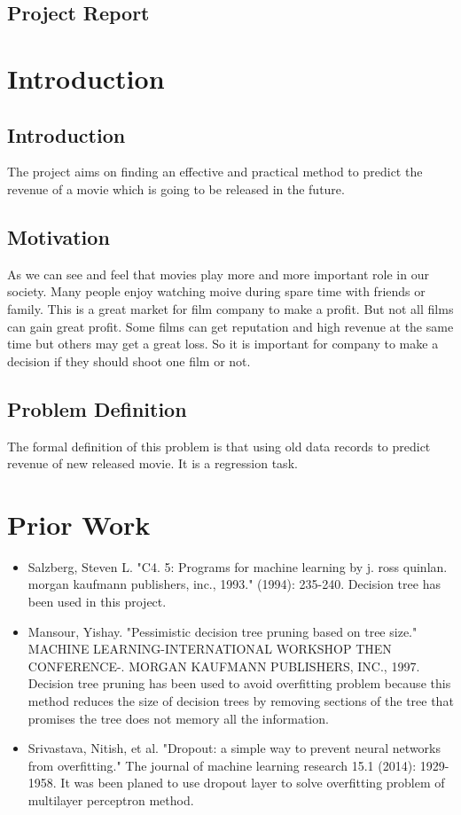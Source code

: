\documentclass[UTF8]{article}
\begin{document}
\begin{center}
    \section*{\textbf{Project Report}}
\end{center}

\section{Introduction}
\subsection{Introduction}
The project aims on finding an effective
and practical method to predict the revenue of a movie which is going to
be released in the future.
\subsection{Motivation}
As we can see and feel that movies play more and more important
role in our society. Many people enjoy watching moive during spare time with friends or family.
This is a great market for film company to make a profit. But not all films can gain great profit.
Some films can get reputation and high revenue at the same time but others may get a great loss.
So it is important for company to make a decision if they should shoot one film or not.
\subsection{Problem Definition}
The formal definition of this problem is that using old data records
to predict revenue of new released movie. It is a regression task.


\section{Prior Work}
\begin{itemize}
    \item Salzberg, Steven L. "C4. 5: Programs for machine learning by j. ross quinlan. morgan kaufmann publishers, inc., 1993." (1994): 235-240.
          Decision tree has been used in this project.
    \item Mansour, Yishay. "Pessimistic decision tree pruning based on tree size." MACHINE LEARNING-INTERNATIONAL WORKSHOP THEN CONFERENCE-. MORGAN KAUFMANN PUBLISHERS, INC., 1997.
          Decision tree pruning has been used to avoid overfitting problem
          because this method reduces the size of decision trees by removing sections of the tree that promises the tree does not memory all the information.
    \item Srivastava, Nitish, et al. "Dropout: a simple way to prevent neural networks from overfitting." The journal of machine learning research 15.1 (2014): 1929-1958.
          It was been planed to use dropout layer to solve overfitting problem of multilayer perceptron method.
\end{itemize}
\end{document}

